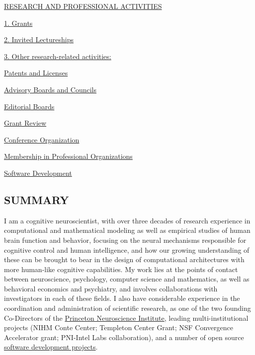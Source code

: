 \documentclass[10 pt]{article}
\begin{document}
\hyperref[secRAPA]{RESEARCH AND PROFESSIONAL ACTIVITIES}

\hyperref[secRAPA1]{\hspace{0.4in} 1. Grants}

\hyperref[secRAPA2]{\hspace{0.4in} 2. Invited Lectureships}

\hyperref[secRAPA3]{\hspace{0.4in} 3. Other research-related activities:}

\hyperref[secPaL]{\hspace{1in} Patents and Licenses}

\hyperref[secABaC]{\hspace{1in} Advisory Boards and Councils}

\hyperref[secEB]{\hspace{1in} Editorial Boards}

\hyperref[secGR]{\hspace{1in} Grant Review}

\hyperref[secCO]{\hspace{1in} Conference Organization}

\hyperref[secMiPO]{\hspace{1in} Membership in Professional Organizations}

\hyperref[secSD]{\hspace{1in} Software Development}

    \newpage


    \begin{center}
\section*{SUMMARY} \label{secSUMMARY}
    \end{center}

I am a cognitive neuroscientist, with over three decades of research experience in computational and mathematical modeling as well as empirical studies of human brain function and behavior, focusing on the neural mechanisms responsible for cognitive control and human intelligence, and how our growing understanding of these can be brought to bear in the design of computational architectures with more human-like cognitive capabilities. My work lies at the points of contact between neuroscience, psychology, computer science and mathematics, as well as behavioral economics and psychiatry, and involves collaborations with investigators in each of these fields. I also have considerable experience in the coordination and administration of scientific research, as one of the two founding Co-Directors of the \href{https://pni.princeton.edu}{Princeton Neuroscience Institute}, leading multi-institutional projects (NIHM Conte Center; Templeton Center Grant; NSF Convergence Accelerator grant; PNI-Intel Labs collaboration), and a number of open source \hyperref[secSD]{software development projects}.
\end{document}
